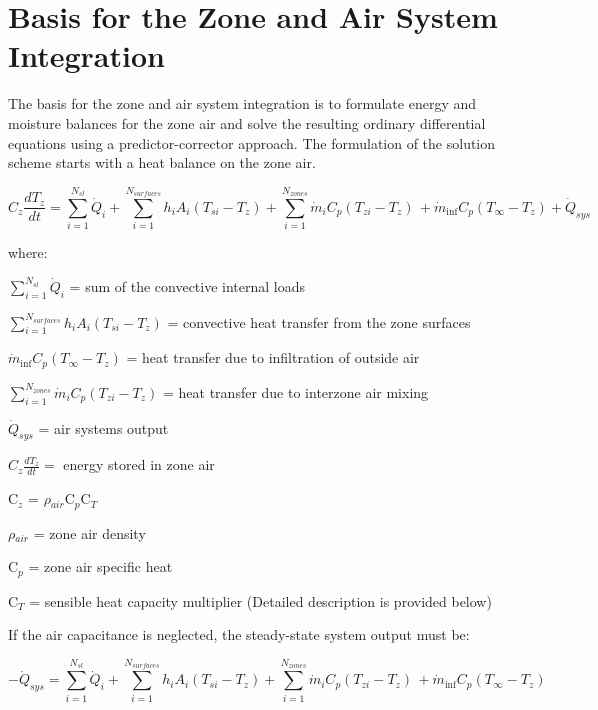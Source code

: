 \section{Basis for the Zone and Air System Integration}\label{basis-for-the-zone-and-air-system-integration}

The basis for the zone and air system integration is to formulate energy and moisture balances for the zone air and solve the resulting ordinary differential equations using a predictor-corrector approach. The formulation of the solution scheme starts with a heat balance on the zone air.

\begin{equation}
{C_z}\frac{{d{T_z}}}{{dt}} = \sum\limits_{i = 1}^{{N_{sl}}} {{{\dot Q}_i}}  + \sum\limits_{i = 1}^{{N_{surfaces}}} {{h_i}} {A_i}\left( {{T_{si}} - {T_z}} \right) + \sum\limits_{i = 1}^{{N_{zones}}} {{{\dot m}_i}} {C_p}\left( {{T_{zi}} - {T_z}} \right)\, + {\dot m_{\inf }}{C_p}\left( {{T_\infty } - {T_z}} \right) + {\dot Q_{sys}}
\label{eq:DiffEqZoneAirHeatBal}
\end{equation}

where:

\(\sum\limits_{i = 1}^{{N_{sl}}} {{{\dot Q}_i}}\) = sum of the convective internal loads

\(\sum\limits_{i = 1}^{{N_{surfaces}}} {{h_i}} {A_i}\left( {{T_{si}} - {T_z}} \right)\) = convective heat transfer from the zone surfaces

\({\dot m_{\inf }}{C_p}\left( {{T_\infty } - {T_z}} \right)\) = heat transfer due to infiltration of outside air

\(\sum_{i = 1}^{N_{zones}} \dot m_i C_p\left( T_{zi} - {T_z} \right)\) = heat transfer due to interzone air mixing

\({\dot Q_{sys}}\) = air systems output

${C_z}\frac{dT_z}{dt} =$ energy stored in zone air

C\(_{z}\) = $\rho$\(_{air}\)C\(_{p}\)C\(_{T}\)

$\rho$\(_{air}\) = zone air density

C\(_{p}\) = zone air specific heat

C\(_{T}\) = sensible heat capacity multiplier (Detailed description is provided below)

If the air capacitance is neglected, the steady-state system output must be:

\begin{equation}
- {\dot Q_{sys}} = \sum\limits_{i = 1}^{{N_{sl}}} {{{\dot Q}_i}}  + \sum\limits_{i = 1}^{{N_{surfaces}}} {{h_i}} {A_i}\left( {{T_{si}} - {T_z}} \right) + \sum\limits_{i = 1}^{{N_{zones}}} {{{\dot m}_i}} {C_p}\left( {{T_{zi}} - {T_z}} \right)\, + {\dot m_{\inf }}{C_p}\left( {{T_\infty } - {T_z}} \right)
\label{eq:SteadyStateSystemOutput}
\end{equation}

